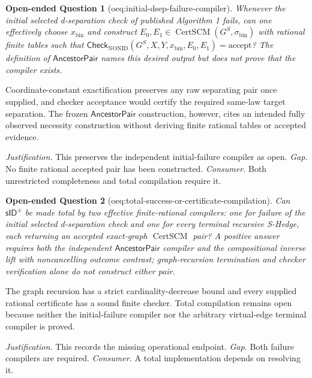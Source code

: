 \documentclass{article}
\newtheorem{openendedquestion}{Open-ended Question}
\begin{document}
\begin{openendedquestion}[oeq:initial-dsep-failure-compiler]\label{oeq:initial-dsep-failure-compiler}
Whenever the initial selected d-separation check of published Algorithm 1 fails, can one effectively choose \(x_{\mathrm{bin}}\) and construct \(E_0,E_1\in\operatorname{CertSCM}(G^S,\sigma_{\mathrm{bin}})\) with rational finite tables such that \(\mathsf{Check}_{\mathrm{NONID}}(G^S,X,Y,x_{\mathrm{bin}},E_0,E_1)=\mathrm{accept}\)? The definition of \(\mathsf{AncestorPair}\) names this desired output but does not prove that the compiler exists.
\end{openendedquestion}
Coordinate-constant exactification preserves any raw separating pair once supplied, and checker acceptance would certify the required same-law target separation. The frozen \(\mathsf{AncestorPair}\) construction, however, cites an intended fully observed necessity construction without deriving finite rational tables or accepted evidence.
\par\smallskip\noindent \textit{Justification.} This preserves the independent initial-failure compiler as open. \textit{Gap.} No finite rational accepted pair has been constructed. \textit{Consumer.} Both unrestricted completeness and total compilation require it.

\begin{openendedquestion}[oeq:total-success-or-certificate-compilation]\label{oeq:total-success-or-certificate-compilation}
Can \(\mathsf{sID}^{\pm}\) be made total by two effective finite-rational compilers: one for failure of the initial selected d-separation check and one for every terminal recursive S-Hedge, each returning an accepted exact-graph \(\operatorname{CertSCM}\) pair? A positive answer requires both the independent \(\mathsf{AncestorPair}\) compiler and the compositional inverse lift with noncancelling outcome contrast; graph-recursion termination and checker verification alone do not construct either pair.
\end{openendedquestion}
The graph recursion has a strict cardinality-decrease bound and every supplied rational certificate has a sound finite checker. Total compilation remains open because neither the initial-failure compiler nor the arbitrary virtual-edge terminal compiler is proved.
\par\smallskip\noindent \textit{Justification.} This records the missing operational endpoint. \textit{Gap.} Both failure compilers are required. \textit{Consumer.} A total implementation depends on resolving it.
\end{document}
